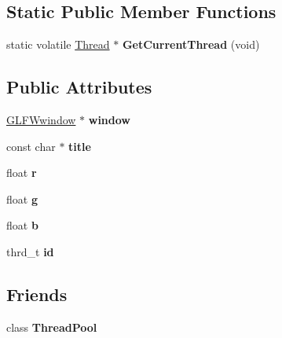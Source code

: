 \subsection*{Static Public Member Functions}
\begin{DoxyCompactItemize}
\item 
\hypertarget{structThread_ab4a44c85ae6f3bf9703f5c4b540e74e9}{}static volatile \hyperlink{structThread}{Thread} $\ast$ {\bfseries Get\+Current\+Thread} (void)\label{structThread_ab4a44c85ae6f3bf9703f5c4b540e74e9}

\end{DoxyCompactItemize}
\subsection*{Public Attributes}
\begin{DoxyCompactItemize}
\item 
\hypertarget{structThread_a82a769d99f3c6c79b0f7e3f4fef31507}{}\hyperlink{group__window_ga3c96d80d363e67d13a41b5d1821f3242}{G\+L\+F\+Wwindow} $\ast$ {\bfseries window}\label{structThread_a82a769d99f3c6c79b0f7e3f4fef31507}

\item 
\hypertarget{structThread_ab096b75dd1b840357dbc6ab584769aec}{}const char $\ast$ {\bfseries title}\label{structThread_ab096b75dd1b840357dbc6ab584769aec}

\item 
\hypertarget{structThread_a4378ca1b75c7424b00ae13f6f5d4c9e4}{}float {\bfseries r}\label{structThread_a4378ca1b75c7424b00ae13f6f5d4c9e4}

\item 
\hypertarget{structThread_aca5efe10d7cf224c065a76143f8c3f4e}{}float {\bfseries g}\label{structThread_aca5efe10d7cf224c065a76143f8c3f4e}

\item 
\hypertarget{structThread_a8fde7e82a29718b6d02c5dec160e5860}{}float {\bfseries b}\label{structThread_a8fde7e82a29718b6d02c5dec160e5860}

\item 
\hypertarget{structThread_a7240a3c3cd6343f6a9d6078b6bae6946}{}thrd\+\_\+t {\bfseries id}\label{structThread_a7240a3c3cd6343f6a9d6078b6bae6946}

\end{DoxyCompactItemize}
\subsection*{Friends}
\begin{DoxyCompactItemize}
\item 
\hypertarget{structThread_a5d97748be7d69dcc44ef551ea35ef20f}{}class {\bfseries Thread\+Pool}\label{structThread_a5d97748be7d69dcc44ef551ea35ef20f}

\end{DoxyCompactItemize}



